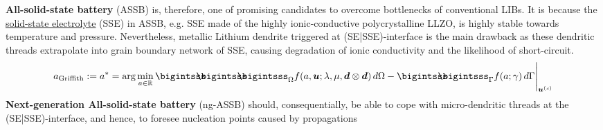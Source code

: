 \documentclass[25pt, a0paper,
portrait,
margin=2mm, 
innermargin=2mm, 
blockverticalspace=7mm, %
colspace=2mm, %
subcolspace=0mm]{tikzposter}
\makeatletter
\newcommand*{\inputfig}[3][htb]{{
    \def\fps@figure{#1}
    \def\DIR{#2}
    \def\LABEL{#3}
    \graphicspath{{\DIR/}}
    
}}
\makeatother
\begin{document}
{\begin{minipage}{0.55\textwidth}
		\textbf{All-solid-state battery} (ASSB) is, therefore, 
		one of promising candidates to overcome bottlenecks of conventional LIBs. 
		It is because the \underline{solid-state electrolyte} (SSE) in ASSB,
		e.g. SSE made of the highly ionic-conductive polycrystalline LLZO, 
		is highly stable towards temperature and pressure. 
		Nevertheless, metallic Lithium dendrite 
		triggered at (SE|SSE)-interface is the main drawback 
		as these dendritic threads extrapolate into grain boundary network of SSE, 
		causing degradation of ionic conductivity 
		and the likelihood of short-circuit.
		\begin{align*}
			a_{\text{Griffith}}:= a^{*}
			= \arg\min_{a\in\mathbb{R}}
			{
				\bigintsss\!\!\!\!\!\!\bigintsss\!\!\!\!\!\!\bigintsss_{\Omega}
				f(a,\bm{u};\lambda,\mu,\bm{d}\otimes\bm{d}) \, d\Omega
				-
				\bigintsss\!\!\!\!\!\!\bigintsss_{\Gamma}
				f(a;\gamma) \, d\Gamma
			}\Bigg|_{\bm{u}^{(s)}}
		\end{align*}
		\textbf{Next-generation All-solid-state battery} (ng-ASSB)
		should, consequentially, be able to cope with 
		micro-dendritic threads at the (SE|SSE)-interface, 
		and hence, 
		to foresee nucleation points caused by propagations 
	\end{minipage}%
	\hfill
	\begin{minipage}{0.35\textwidth}
		\inputfig{floats/dendrite_pdirection_battonly}{dendrite_pdirection_battonly}
	\end{minipage}%
}
\end{document}
